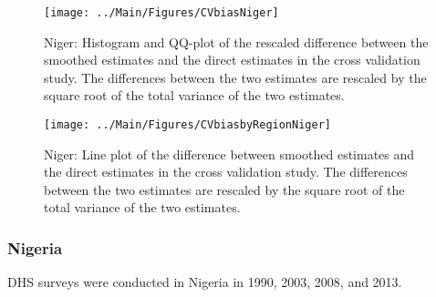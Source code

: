 \documentclass[12pt]{article}\usepackage[]{graphicx}\usepackage[]{color}
\newenvironment{knitrout}{}{} %
\begin{document}
\begin{knitrout}
\color{fgcolor}\begin{figure}[bht]

{\centering \texttt{[image: ../Main/Figures/CVbiasNiger]} 

}

\caption[Niger]{Niger: Histogram and QQ-plot of the rescaled difference between the smoothed estimates and the direct estimates in the cross validation study. The differences between the two estimates are rescaled by the square root of the total variance of the two estimates.}\label{fig:unnamed-chunk-259}
\end{figure}


\end{knitrout}

\begin{knitrout}
\color{fgcolor}\begin{figure}[bht]

{\centering \texttt{[image: ../Main/Figures/CVbiasbyRegionNiger]} 

}

\caption[Niger]{Niger: Line plot of the difference between smoothed estimates and the direct estimates in the cross validation study. The differences between the two estimates are rescaled by the square root of the total variance of the two estimates.}\label{fig:unnamed-chunk-260}
\end{figure}


\end{knitrout}


\clearpage
\subsubsection{Nigeria}





DHS surveys were conducted in Nigeria in 1990, 2003, 2008, and 2013.
\end{document}
